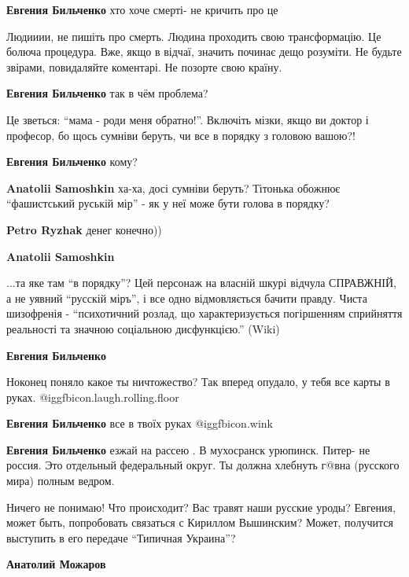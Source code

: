 \begin{itemize}
\begin{itemize}
\textbf{Евгения Бильченко} хто хоче смерті- не кричить про це

Людииии, не пишіть про смерть.
Людина проходить свою трансформацію. Це болюча процедура.
Вже, якщо в відчаї, значить починає дещо розуміти.
Не будьте звірами, повидаляйте коментарі. Не позорте свою країну.

\textbf{Евгения Бильченко} так в чём проблема?


Це зветься: \enquote{мама - роди меня обратно!}. Включіть мізки, якщо ви доктор і
професор, бо щось сумніви беруть, чи все в порядку з головою вашою?!


\textbf{Евгения Бильченко} кому?

\textbf{Anatolii Samoshkin} ха-ха, досі сумніви беруть? Тітонька обожнює \enquote{фашистський руській мір} - як у неї може бути голова в порядку?

\textbf{Petro Ryzhak} денег конечно))

\textbf{Anatolii Samoshkin} 

...та яке там \enquote{в порядку}? Цей персонаж на власній шкурі відчула СПРАВЖНІЙ, а
не уявний \enquote{русскій міръ}, і все одно відмовляється бачити правду. Чиста
шизофренія - \enquote{психотичний розлад, що характеризується погіршенням сприйняття
реальності та значною соціальною дисфункцією.} (Wiki)

\textbf{Евгения Бильченко} 

Ноконец поняло какое ты ничтожество? Так вперед опудало, у тебя все карты в
руках. @igg{fbicon.laugh.rolling.floor} 

\textbf{Евгения Бильченко} все в твоїх руках  @igg{fbicon.wink} 

\textbf{Евгения Бильченко} езжай на рассею
. В мухосранск урюпинск. Питер- не россия. Это отдельный федеральный округ. Ты должна хлебнуть г@вна (русского мира) полным ведром.
\end{itemize} %


Ничего не понимаю! Что происходит? Вас травят наши русские уроды? Евгения,
может быть, попробовать связаться с Кириллом Вышинским? Может, получится
выступить в его передаче \enquote{Типичная Украина}?

\begin{itemize} %
\textbf{Анатолий Можаров} 


\end{itemize}
\end{itemize}
